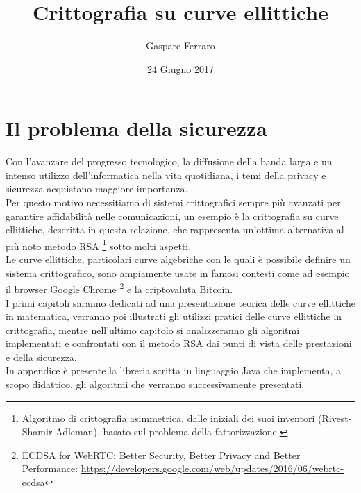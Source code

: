 \documentclass{article}
\title{Crittografia su curve ellittiche}
\author{Gaspare Ferraro}
\date{24 Giugno 2017}
\begin{document}
	
	\maketitle
	\thispagestyle{empty}
	
	\clearpage
	
	\tableofcontents
	
	\clearpage
	
	\section{Il problema della sicurezza}
	
	Con l'avanzare del progresso tecnologico, la diffusione della banda larga e un intenso utilizzo dell'informatica
	nella vita quotidiana, i temi della privacy e sicurezza acquistano maggiore importanza.\\
	
	Per questo motivo necessitiamo di sistemi crittografici sempre più avanzati per garantire affidabilità 
	nelle comunicazioni, un esempio è la crittografia su curve ellittiche, descritta in questa relazione, 
	che rappresenta un'ottima alternativa al più noto metodo RSA
	\footnote{Algoritmo di crittografia asimmetrica, dalle iniziali dei suoi inventori (Rivest-Shamir-Adleman), basato sul problema della fattorizzazione.   } 
	sotto molti aspetti.\\
	
	Le curve ellittiche, particolari curve algebriche con le quali è possibile definire un sistema crittografico,
	sono ampiamente usate in famosi contesti come ad esempio il browser Google Chrome
	\footnote{ECDSA for WebRTC: Better Security, Better Privacy and Better Performance: \url{https://developers.google.com/web/updates/2016/06/webrtc-ecdsa}} e la criptovaluta Bitcoin.\\
	
	I primi capitoli saranno dedicati ad una presentazione teorica delle curve ellittiche in matematica, 
	verranno poi illustrati gli utilizzi pratici delle curve ellittiche in crittografia, 
	mentre nell'ultimo capitolo si analizzeranno gli algoritmi implementati e confrontati 
	con il metodo RSA dai punti di vista delle prestazioni e della sicurezza.\\
	
	In appendice è presente la libreria scritta in linguaggio Java che implementa, a scopo didattico, gli algoritmi che verranno successivamente presentati.
	
	\clearpage
	
\end{document}
